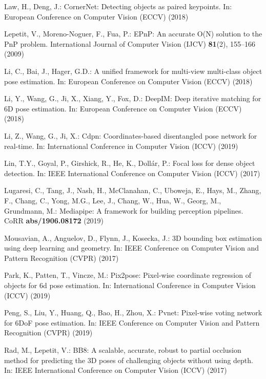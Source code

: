 \documentclass[runningheads]{llncs}
\begin{document}
\begin{thebibliography}{10}
Law, H., Deng, J.: {CornerNet}: Detecting objects as paired keypoints. In:
  European Conference on Computer Vision (ECCV) (2018)

Lepetit, V., Moreno-Noguer, F., Fua, P.: {EPnP}: An accurate {O(N)} solution to
  the {PnP} problem. International Journal of Computer Vision (IJCV)
  \textbf{81}(2),  155--166 (2009)

Li, C., Bai, J., Hager, G.D.: A unified framework for multi-view multi-class
  object pose estimation. In: European Conference on Computer Vision (ECCV)
  (2018)

Li, Y., Wang, G., Ji, X., Xiang, Y., Fox, D.: {DeepIM}: Deep iterative matching
  for {6D} pose estimation. In: European Conference on Computer Vision (ECCV)
  (2018)

Li, Z., Wang, G., Ji, X.: Cdpn: Coordinates-based disentangled pose network for
  real-time. In: International Conference in Computer Vision (ICCV) (2019)

Lin, T.Y., Goyal, P., Girshick, R., He, K., Doll\'{a}r, P.: Focal loss for
  dense object detection. In: IEEE International Conference on Computer Vision
  (ICCV) (2017)

Lugaresi, C., Tang, J., Nash, H., McClanahan, C., Uboweja, E., Hays, M., Zhang,
  F., Chang, C., Yong, M.G., Lee, J., Chang, W., Hua, W., Georg, M., Grundmann,
  M.: Mediapipe: {A} framework for building perception pipelines. CoRR
  \textbf{abs/1906.08172} (2019)

Mousavian, A., Anguelov, D., Flynn, J., Kosecka, J.: {3D} bounding box
  estimation using deep learning and geometry. In: IEEE Conference on Computer
  Vision and Pattern Recognition (CVPR) (2017)

Park, K., Patten, T., Vincze, M.: Pix2pose: Pixel-wise coordinate regression of
  objects for 6d pose estimation. In: International Conference in Computer
  Vision (ICCV) (2019)

Peng, S., Liu, Y., Huang, Q., Bao, H., Zhou, X.: Pvnet: Pixel-wise voting
  network for {6DoF} pose estimation. In: IEEE Conference on Computer Vision
  and Pattern Recognition (CVPR) (2019)

Rad, M., Lepetit, V.: {BB8}: A scalable, accurate, robust to partial occlusion
  method for predicting the {3D} poses of challenging objects without using
  depth. In: IEEE International Conference on Computer Vision (ICCV) (2017)


\end{thebibliography}
\end{document}
